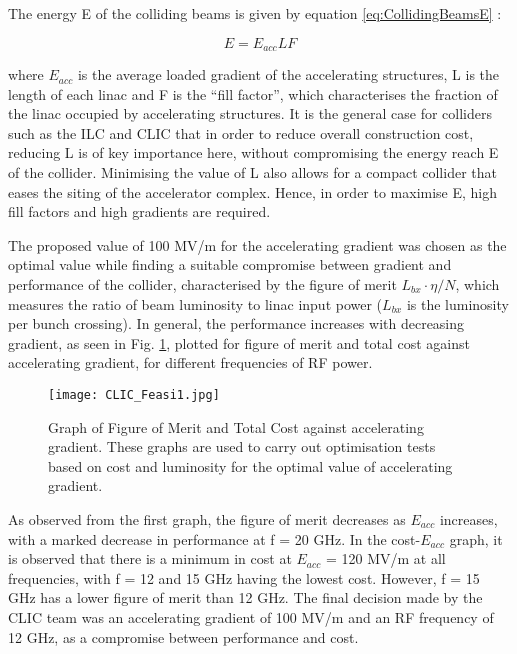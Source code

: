 The energy E of the colliding beams is given by equation \ref{eq:CollidingBeamsE} \cite{CLIC:Concept}:

\begin{equation}
    E = E_{acc} L F
    \label{eq:CollidingBeamsE}
\end{equation}

where $E_{acc}$ is the average loaded gradient of the accelerating structures, L is the length of each linac and F is the ``fill factor'', which characterises the fraction of the linac occupied by accelerating structures. It is the general case for colliders such as the ILC and CLIC that in order to reduce overall construction cost, reducing L is of key importance here, without compromising the energy reach E of the collider. Minimising the value of L also allows for a compact collider that eases the siting of the accelerator complex. Hence, in order to maximise E, high fill factors and high gradients are required.

The proposed value of 100 MV/m for the accelerating gradient was chosen as the optimal value while finding a suitable compromise between gradient and performance of the collider, characterised by the figure of merit $L_{bx} \cdot \eta /N$, which measures the ratio of beam luminosity to linac input power ($L_{bx}$ is the luminosity per bunch crossing). In general, the performance increases with decreasing gradient, as seen in Fig. \ref{fig:CLIC:Feasi1}, plotted for figure of merit and total cost against accelerating gradient, for different frequencies of RF power.


\begin{figure}[!htb]
    \centering
    \texttt{[image: CLIC\_Feasi1.jpg]}
    
    \caption{Graph of Figure of Merit and Total Cost against accelerating gradient. These graphs are used to carry out optimisation tests based on cost and luminosity for the optimal value of accelerating gradient. \cite{CLIC:Concept}}
    \label{fig:CLIC:Feasi1}
\end{figure}

As observed from the first graph, the figure of merit decreases as $E_{acc}$ increases, with a marked decrease in performance at f = 20 GHz. In the cost-$E_{acc}$ graph, it is observed that there is a minimum in cost at $E_{acc}$ = 120 MV/m at all frequencies, with f = 12 and 15 GHz having the lowest cost. However, f = 15 GHz has a lower figure of merit than 12 GHz. The final decision made by the CLIC team was an accelerating gradient of 100 MV/m and an RF frequency of 12 GHz, as a compromise between performance and cost.

